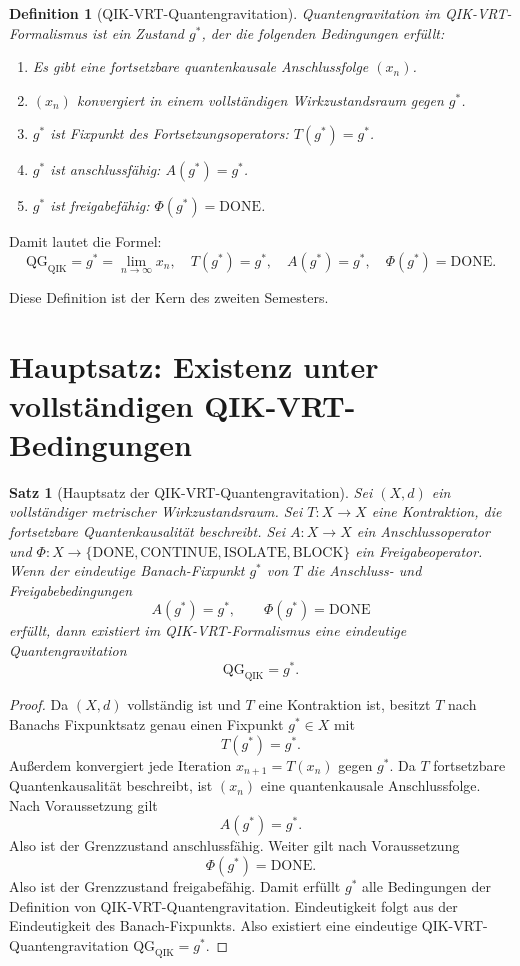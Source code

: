 \documentclass[11pt,a4paper,oneside]{scrartcl}
\theoremstyle{qikstyle}
\newtheorem{definition}{Definition}[section]
\newtheorem{satz}{Satz}[section]
\newcommand{\QIK}{\mathrm{QIK}}
\newcommand{\DONE}{\mathrm{DONE}}
\newcommand{\CONTINUE}{\mathrm{CONTINUE}}
\newcommand{\ISOLATE}{\mathrm{ISOLATE}}
\newcommand{\BLOCK}{\mathrm{BLOCK}}
\newcommand{\Phiop}{\Phi}
\begin{document}
\begin{definition}[QIK-VRT-Quantengravitation]
Quantengravitation im QIK-VRT-Formalismus ist ein Zustand \(g^*\), der die folgenden Bedingungen erfüllt:
\begin{enumerate}
\item Es gibt eine fortsetzbare quantenkausale Anschlussfolge \((x_n)\).
\item \((x_n)\) konvergiert in einem vollständigen Wirkzustandsraum gegen \(g^*\).
\item \(g^*\) ist Fixpunkt des Fortsetzungsoperators: \(T(g^*)=g^*\).
\item \(g^*\) ist anschlussfähig: \(A(g^*)=g^*\).
\item \(g^*\) ist freigabefähig: \(\Phiop(g^*)=\DONE\).
\end{enumerate}
\end{definition}

Damit lautet die Formel:
\[
\boxed{\mathrm{QG}_{\QIK}=g^*=\lim_{n\to\infty}x_n,\quad T(g^*)=g^*,\quad A(g^*)=g^*,\quad \Phiop(g^*)=\DONE.}
\]

Diese Definition ist der Kern des zweiten Semesters.
\newpage

\section{Hauptsatz: Existenz unter vollständigen QIK-VRT-Bedingungen}

\begin{satz}[Hauptsatz der QIK-VRT-Quantengravitation]
Sei \((X,d)\) ein vollständiger metrischer Wirkzustandsraum. Sei \(T:X\to X\) eine Kontraktion, die fortsetzbare Quantenkausalität beschreibt. Sei \(A:X\to X\) ein Anschlussoperator und \(\Phiop:X\to\{\DONE,\CONTINUE,\ISOLATE,\BLOCK\}\) ein Freigabeoperator. Wenn der eindeutige Banach-Fixpunkt \(g^*\) von \(T\) die Anschluss- und Freigabebedingungen
\[
A(g^*)=g^*,\qquad \Phiop(g^*)=\DONE
\]
erfüllt, dann existiert im QIK-VRT-Formalismus eine eindeutige Quantengravitation
\[
\mathrm{QG}_{\QIK}=g^*.
\]
\end{satz}

\begin{proof}
Da \((X,d)\) vollständig ist und \(T\) eine Kontraktion ist, besitzt \(T\) nach Banachs Fixpunktsatz genau einen Fixpunkt \(g^*\in X\) mit
\[
T(g^*)=g^*.
\]
Außerdem konvergiert jede Iteration \(x_{n+1}=T(x_n)\) gegen \(g^*\). Da \(T\) fortsetzbare Quantenkausalität beschreibt, ist \((x_n)\) eine quantenkausale Anschlussfolge. Nach Voraussetzung gilt
\[
A(g^*)=g^*.
\]
Also ist der Grenzzustand anschlussfähig. Weiter gilt nach Voraussetzung
\[
\Phiop(g^*)=\DONE.
\]
Also ist der Grenzzustand freigabefähig. Damit erfüllt \(g^*\) alle Bedingungen der Definition von QIK-VRT-Quantengravitation. Eindeutigkeit folgt aus der Eindeutigkeit des Banach-Fixpunkts. Also existiert eine eindeutige QIK-VRT-Quantengravitation \(\mathrm{QG}_{\QIK}=g^*\).
\end{proof}
\end{document}
